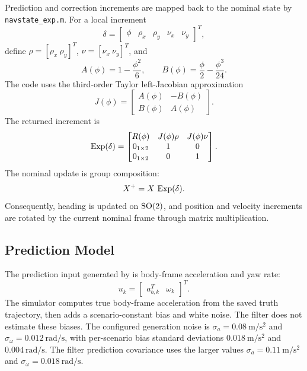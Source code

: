 Prediction and correction increments are mapped back to the nominal state by \texttt{navstate\_exp.m}. For a local increment
\begin{equation}
    \delta =
    \begin{bmatrix}
    \phi & \rho_x & \rho_y & \nu_x & \nu_y
    \end{bmatrix}^{T},
\end{equation}
define \(\rho=[\rho_x\ \rho_y]^T\), \(\nu=[\nu_x\ \nu_y]^T\), and
\begin{equation}
    A(\phi)=1-\frac{\phi^2}{6}, \qquad
    B(\phi)=\frac{\phi}{2}-\frac{\phi^3}{24}.
\end{equation}
The code uses the third-order Taylor left-Jacobian approximation
\begin{equation}
    J(\phi)=
    \begin{bmatrix}
    A(\phi) & -B(\phi) \\
    B(\phi) & A(\phi)
    \end{bmatrix}.
\end{equation}
The returned increment is
\begin{equation}
\operatorname{Exp}(\delta)=
\begin{bmatrix}
R(\phi) & J(\phi)\rho & J(\phi)\nu \\
0_{1\times 2} & 1 & 0 \\
0_{1\times 2} & 0 & 1
\end{bmatrix}.
\label{eq:nav_exp}
\end{equation}
The nominal update is group composition:
\begin{equation}
    X^{+}=X\,\operatorname{Exp}(\delta).
\end{equation}
Consequently, heading is updated on \(\mathrm{SO}(2)\), and position and velocity increments are rotated by the current nominal frame through matrix multiplication.

\subsection{Prediction Model}

The prediction input generated by  is body-frame acceleration and yaw rate:
\begin{equation}
    u_k =
    \begin{bmatrix}
    a_{b,k}^{T} & \omega_k
    \end{bmatrix}^{T}.
\end{equation}
The simulator computes true body-frame acceleration from the saved   truth trajectory, then adds a scenario-constant bias and white noise. The filter does not estimate these biases. The configured generation noise is \(\sigma_a=0.08~\mathrm{m/s^2}\) and \(\sigma_\omega=0.012~\mathrm{rad/s}\), with per-scenario bias standard deviations \(0.018~\mathrm{m/s^2}\) and \(0.004~\mathrm{rad/s}\). The filter prediction covariance uses the larger values \(\sigma_a=0.11~\mathrm{m/s^2}\) and \(\sigma_\omega=0.018~\mathrm{rad/s}\).

